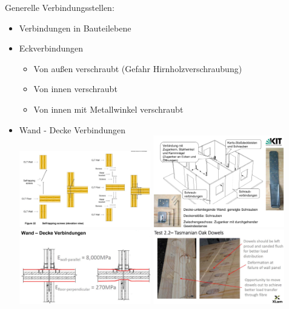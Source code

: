 \documentclass[fleqn,twoside]{article}
\begin{document}
Generelle Verbindungsstellen:
    \begin{itemize}
        \item Verbindungen in Bauteilebene
        \item Eckverbindungen
            \begin{itemize}
                \item Von außen verschraubt (Gefahr Hirnholzverschraubung)
                \item Von innen verschraubt
                \item Von innen mit Metallwinkel verschraubt
            \end{itemize}
        \item Wand - Decke Verbindungen\\
            \includegraphics[width=0.45\textwidth]{Grafiken/CLT-Verbindungen/Wand-Decke mit Schrauben.png}
            \includegraphics[width=0.45\textwidth]{Grafiken/CLT-Verbindungen/Wand-Decke Uebersicht.png}\\
            \includegraphics[width=0.45\textwidth]{Grafiken/CLT-Verbindungen/Wand-Decke Pressung.png}
            \includegraphics[width=0.45\textwidth]{Grafiken/CLT-Verbindungen/Wand-Decke Dowels.png}\\

\end{itemize}
\end{document}
